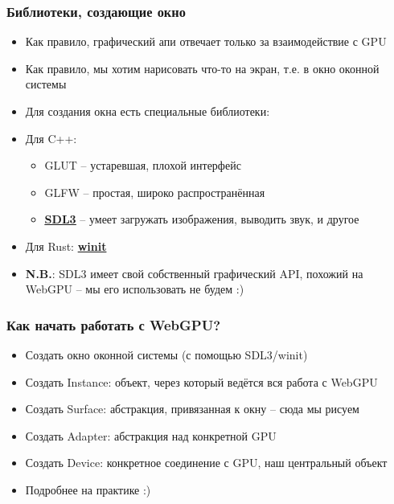 \documentclass[10pt]{beamer}
\begin{document}
\begin{frame}
\frametitle{Библиотеки, создающие окно}
\begin{itemize}
\item Как правило, графический апи отвечает только за взаимодействие с GPU
\pause
\item Как правило, мы хотим нарисовать что-то на экран, т.е. в окно оконной системы
\pause
\item Для создания окна есть специальные библиотеки:
\pause
\item Для C++:
\begin{itemize}
\item GLUT -- устаревшая, плохой интерфейс
\item GLFW -- простая, широко распространённая
\item \href{https://www.libsdl.org/}{\alert{\textbf{\underline{SDL3}}}} -- умеет загружать изображения, выводить звук, и другое
\end{itemize}
\pause
\item Для Rust: \alert{\textbf{\underline{winit}}}
\pause
\item \textbf{N.B.}: SDL3 имеет свой собственный графический API, похожий на WebGPU -- мы его использовать не будем :)
\end{itemize}
\end{frame}

\begin{frame}[fragile]
\frametitle{Как начать работать с WebGPU?}
\begin{itemize}
\item Создать окно оконной системы (с помощью SDL3/winit)
\pause
\item Создать Instance: объект, через который ведётся вся работа с WebGPU
\pause
\item Создать Surface: абстракция, привязанная к окну -- сюда мы рисуем
\pause
\item Создать Adapter: абстракция над конкретной GPU
\pause
\item Создать Device: конкретное соединение с GPU, наш центральный объект
\pause
\item Подробнее на практике :)
\end{itemize}
\end{frame}
\end{document}
